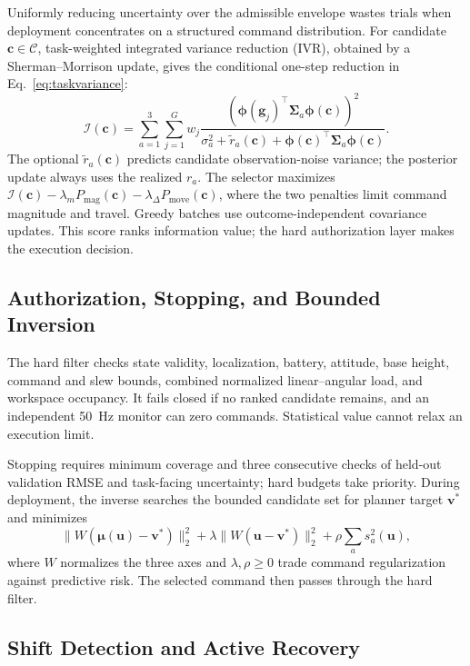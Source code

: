 \documentclass[letterpaper,10pt,conference]{ieeeconf}
\newcommand{\vect}[1]{\boldsymbol{#1}}
\begin{document}
Uniformly reducing uncertainty over the admissible envelope wastes trials when
deployment concentrates on a structured command distribution. For candidate
$\vect{c}\in\mathcal{C}$, task-weighted integrated variance reduction (IVR),
obtained by a Sherman--Morrison update, gives the conditional one-step reduction
in Eq.~\eqref{eq:taskvariance}:
\begin{equation}
 \mathcal{I}(\vect{c})=
 \sum_{a=1}^{3}\sum_{j=1}^{G} w_j
 \frac{\left(\vect{\phi}(\vect{g}_j)^\top\vect{\Sigma}_a
 \vect{\phi}(\vect{c})\right)^2}
 {\sigma_a^2+\tilde r_a(\vect{c})+
 \vect{\phi}(\vect{c})^\top\vect{\Sigma}_a
 \vect{\phi}(\vect{c})}.
 \label{eq:ivr}
\end{equation}
The optional $\tilde r_a(\vect{c})$ predicts candidate observation-noise
variance; the posterior update always uses the realized $r_a$. The selector maximizes
$\mathcal{I}(\vect{c})-\lambda_mP_{\mathrm{mag}}(\vect{c})-
\lambda_{\Delta}P_{\mathrm{move}}(\vect{c})$, where the two penalties limit
command magnitude and travel. Greedy batches use
outcome-independent covariance updates. This score ranks information value;
the hard authorization layer makes the execution decision.

\subsection{Authorization, Stopping, and Bounded Inversion}

The hard filter checks state validity, localization, battery, attitude, base
height, command and slew bounds, combined normalized linear--angular load, and
workspace occupancy. It
fails closed if no ranked candidate remains, and an independent 50~Hz monitor
can zero commands. Statistical value cannot relax an execution limit.

Stopping requires minimum coverage and three consecutive checks of held-out
validation RMSE and task-facing uncertainty; hard budgets take priority. During
deployment, the inverse searches the bounded candidate set for planner target
$\vect{v}^{*}$ and minimizes
\begin{equation}
 \|W(\vect{\mu}(\vect{u})-\vect{v}^{*})\|_2^2+\lambda
 \|W(\vect{u}-\vect{v}^{*})\|_2^2+\rho\sum_a s_a^2(\vect{u}),
 \label{eq:inverse}
\end{equation}
where $W$ normalizes the three axes and $\lambda,\rho\geq0$ trade command
regularization against predictive risk. The selected command then passes
through the hard filter.

\subsection{Shift Detection and Active Recovery}
\end{document}
